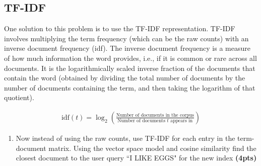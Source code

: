 \documentclass{assignment format}
\begin{document}
\subsection{TF-IDF}
One solution to this problem is to use the TF-IDF representation.
    TF-IDF involves multiplying the term frequency (which can be the raw counts) with an inverse document frequency (idf). 
    The inverse document frequency is a measure of how much information the word provides, i.e., if it is common or rare across all documents. 
     It is the logarithmically scaled inverse fraction of the documents that contain the word (obtained by dividing the total number of documents by the number of documents containing the term, and then taking the logarithm of that quotient).
     
     \begin{align*}
         \text{idf}(t) = \log_2(\frac{\text{Number of documents in the corpus}}{\text{Number of documents $t$ appears in}})
     \end{align*}\begin{enumerate}[label=(\alph*)]
         \item  Now instead of using the raw counts, use TF-IDF for each entry in the term-document matrix. Using the vector space model and cosine similarity find the closest document to the user query ``I LIKE EGGS" for the new index  \textbf{(4pts)}


\end{enumerate}
\end{document}
